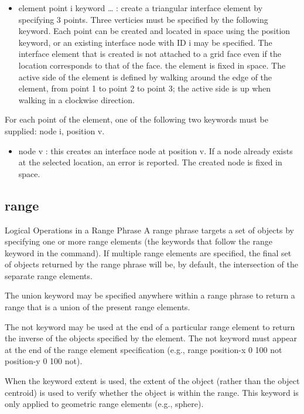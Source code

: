 \documentclass[a4paper, nobind]{templates/ociamthesis}
\providecommand{\tightlist}{%
  \setlength{\itemsep}{0pt}\setlength{\parskip}{0pt}}
\begin{document}
\begin{itemize}
\tightlist
\item
  element point i keyword \ldots{} : create a triangular interface element
  by specifying 3 points. Three verticies must be specified by the
  following keyword. Each point can be created and located in space
  using the position keyword, or an existing interface node with ID i
  may be specified. The interface element that is created is not
  attached to a grid face even if the location corresponds to that of
  the face. the element is fixed in space. The active side of the
  element is defined by walking around the edge of the element, from
  point 1 to point 2 to point 3; the active side is up when walking in
  a clockwise direction.
\end{itemize}

For each point of the element, one of the following two keywords must be
supplied: node i, position v.

\begin{itemize}
\tightlist
\item
  node v : this creates an interface node at position v. If a node
  already exists at the selected location, an error is reported. The
  created node is fixed in space.
\end{itemize}

\hypertarget{range}{%
\subsection{range}\label{range}}

Logical Operations in a Range Phrase A range phrase targets a set of
objects by specifying one or more range elements (the keywords that
follow the range keyword in the command). If multiple range elements are
specified, the final set of objects returned by the range phrase will
be, by default, the intersection of the separate range elements.

The union keyword may be specified anywhere within a range phrase to
return a range that is a union of the present range elements.

The not keyword may be used at the end of a particular range element to
return the inverse of the objects specified by the element. The not
keyword must appear at the end of the range element specification (e.g.,
range position-x 0 100 not position-y 0 100 not).

When the keyword extent is used, the extent of the object (rather than
the object centroid) is used to verify whether the object is within the
range. This keyword is only applied to geometric range elements (e.g.,
sphere).
\end{document}
